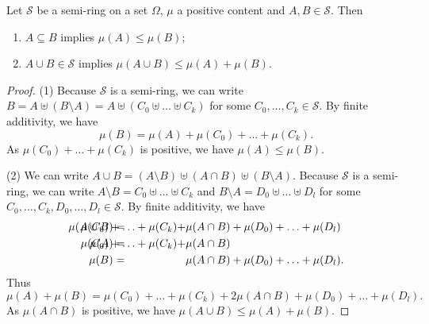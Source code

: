 \begin{proposition} \label{semiringPositiveContent}
Let $\mathcal{S}$ be a semi-ring on a set $\Omega$, $\mu$ a positive content and $A,B\in \mathcal{S}$. Then
\begin{enumerate}
\item $A\subseteq B$ implies $\mu(A) \leq \mu(B)$;
\item $A\cup B\in\mathcal{S}$ implies $\mu(A \cup B) \leq \mu(A) + \mu(B)$.
\end{enumerate}
\end{proposition}
\begin{proof}
(1) Because $\mathcal{S}$ is a semi-ring, we can write $B = A \uplus (B\setminus A) = A \uplus (C_0 \uplus \ldots \uplus C_k)$ for some $C_0,\ldots, C_k\in\mathcal{S}$. By finite additivity, we have
\[ \mu(B) = \mu(A) + \mu(C_0) + \ldots + \mu(C_k). \]
As $\mu(C_0) + \ldots + \mu(C_k)$ is positive, we have $\mu(A) \leq \mu(B)$.

(2) We can write $A\cup B = (A\setminus B) \uplus (A\cap B) \uplus (B\setminus A)$. Because $\mathcal{S}$ is a semi-ring, we can write $A\setminus B = C_0 \uplus \ldots \uplus C_k$ and $B\setminus A = D_0 \uplus \ldots \uplus D_l$ for some $C_0,\ldots, C_k, D_0,\ldots, D_l\in\mathcal{S}$. By finite additivity, we have
\begin{align*}
\mu(A\cup B) &= & \hspace{-5em} \mu(C_0) + \ldots + \mu(C_k) + &\mu(A\cap B) + \mu(D_0) + \ldots + \mu(D_l) \\
\mu(A) &= & \hspace{-5em} \mu(C_0) + \ldots + \mu(C_k) + &\mu(A\cap B) \\
\mu(B) &= & &\mu(A\cap B) + \mu(D_0) + \ldots + \mu(D_l).
\end{align*}
Thus
\[ \mu(A)+\mu(B) = \mu(C_0) + \ldots + \mu(C_k) + 2\mu(A\cap B) + \mu(D_0) + \ldots + \mu(D_l). \]
As $\mu(A\cap B)$ is positive, we have $\mu(A\cup B) \leq \mu(A)+\mu(B)$.
\end{proof}

